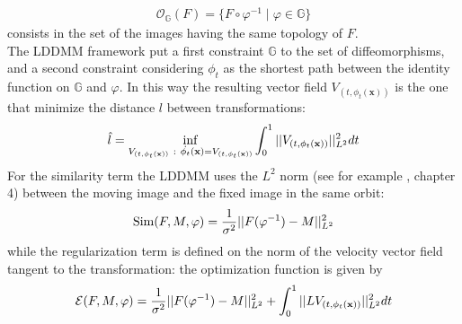 \begin{align*}
\mathcal{O}_{\mathbb{G}}(F) = \{ F\circ \varphi^{-1} \mid \varphi \in \mathbb{G} \}
\end{align*}
consists in the set of the images having the same topology of $F$.\\
The LDDMM framework put a first constraint $\mathbb{G}$ to the set of diffeomorphisms, and a second constraint considering $\phi_{t}$ as the shortest path between the identity function on $\mathbb{G}$ and $\varphi$. In this way the resulting vector field $V_{(t,\phi_{t} (\mathbf{x}))}$ is the one that minimize the distance $l$ between transformations:
\begin{align*}
\hat{l} = \inf_{V_{(t,\phi_{t} (\mathbf{x}))} ~ : ~ \dot{\phi_{t}} (\mathbf{x}) = V_{(t,\phi_{t} (\mathbf{x}))}  
				       }
	\int_{0}^{1} \vert\lvert V_{(t,\phi_{t} (\mathbf{x}))} \rvert\vert_{L^2}^{2}dt
\end{align*}
For the similarity term the LDDMM uses the $L^{2}$ norm (see for example \cite{stein2009real}, chapter 4) between the moving image and the fixed image in the same orbit:
\begin{align*}
\text{Sim}(F,M,\varphi) = \frac{1}{\sigma^2}\vert\lvert F(\varphi^{-1})  - M   \rvert\vert_{L^{2}}^{2}
\end{align*}
while the regularization term is defined on the norm of the velocity vector field tangent to the transformation: the optimization function is given by 
\begin{align*}
\mathcal{E}(F, M, \varphi) 
= 
\frac{1}{\sigma^2}\vert\lvert F(\varphi^{-1})  - M   \rvert\vert_{L^{2}}^{2}
 +
\int_0^1 \vert\lvert L V_{(t,\phi_{t} (\mathbf{x}))}  \rvert\vert_{L^{2}}^{2} dt
\end{align*}

